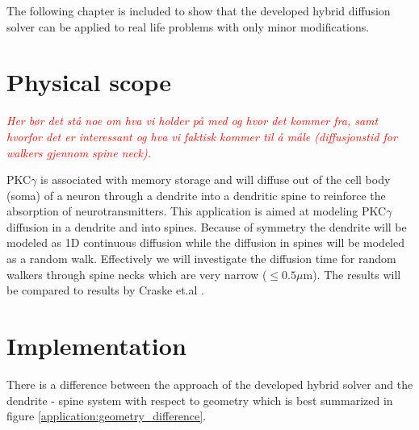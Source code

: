 The following chapter is included to show that the developed hybrid diffusion solver can be applied to real life problems with only minor modifications.

\section{Physical scope}


\emph{\textcolor{red}{Her bør det stå noe om hva vi holder på med og hvor det kommer fra, samt hvorfor det er interessant og hva vi faktisk kommer til å måle (diffusjonstid for walkers gjennom spine neck).}}

PKC$\gamma$ is associated with memory storage and will diffuse out of the cell body (soma) of a neuron through a dendrite into a dendritic spine to reinforce the absorption of neurotransmitters. 
This application is aimed at modeling PKC$\gamma$ diffusion in a dendrite and into spines. 
Because of symmetry the dendrite will be modeled as 1D continuous diffusion while the diffusion in spines will be modeled as a random walk. 
Effectively we will investigate the diffusion time for random walkers through spine necks which are very narrow ($\leq0.5\mu$m). 
The results will be compared to results by Craske et.al \cite{craske2005spines}.

\section{Implementation}

There is a difference between the approach of the developed hybrid solver and the dendrite - spine system with respect to geometry which is best summarized in figure \ref{application:geometry_difference}.

